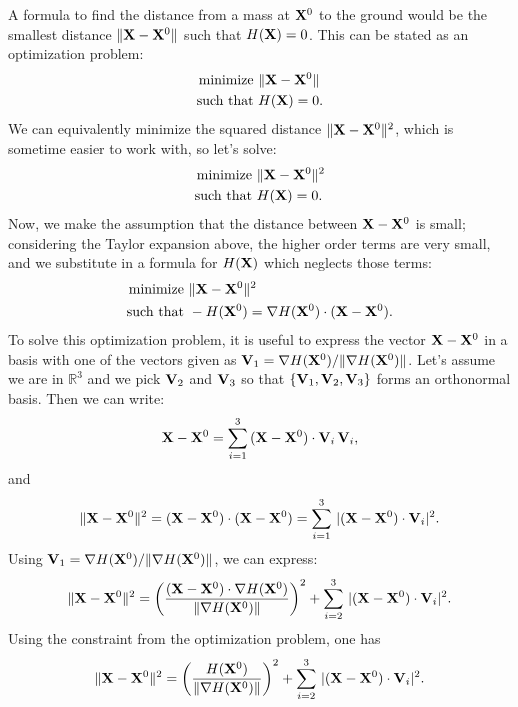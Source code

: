 \documentclass[10pt]{article}
\begin{document}
A formula to find the distance from a mass at ${\bf X}^0$ to the ground would be the smallest distance $\|{\bf X} - {\bf X}^0\|$ such that $H({\bf X}) = 0$.  This can be stated as an optimization problem:
\begin{align*}
\text{minimize } &\|{\bf X} - {\bf X}^0\| \\
\text{such that } &H({\bf X}) = 0.
\end{align*}
We can equivalently minimize the squared distance $\|{\bf X} - {\bf X}^0\|^2$, which is sometime easier to work with, so let's solve:
\begin{align*}
\text{minimize } &\|{\bf X} - {\bf X}^0\|^2 \\
\text{such that } &H({\bf X}) = 0.
\end{align*}
Now, we make the assumption that the distance between ${\bf X} - {\bf X}^0$ is small; considering the Taylor expansion above, the higher order terms are very small, and we substitute in a formula for $H({\bf X})$ which neglects those terms: 
\begin{align*}
\text{minimize } &\|{\bf X} - {\bf X}^0\|^2 \\
\text{such that } &-H({\bf X}^0) = \nabla H({\bf X}^0) \cdot ({\bf X} - {\bf X}^0).
\end{align*}
To solve this optimization problem, it is useful to express the vector ${\bf X} - {\bf X}^0$ in a basis with one of the vectors given as ${\bf V}_1 = \nabla H({\bf X}^0) / \|  \nabla H({\bf X}^0) \|$.  Let's assume we are in $\mathbb{R}^3$ and we pick ${\bf V}_2$ and ${\bf V}_3$ so that $\{ {\bf V}_1,  {\bf V}_2,  {\bf V}_3 \}$ forms an orthonormal basis.  Then we can write:
\begin{align*}
{\bf X} - {\bf X}^0 = \sum_{i=1}^3 \, ({\bf X} - {\bf X}^0) \cdot {\bf V}_i \, {\bf V}_i, 
\end{align*} 
and
\textbf{\begin{align*}
\|{\bf X} - {\bf X}^0\|^2 = ({\bf X} - {\bf X}^0) \cdot ({\bf X} - {\bf X}^0) = \sum_{i=1}^3 \, |({\bf X} - {\bf X}^0) \cdot {\bf V}_i|^2. 
\end{align*} }
Using ${\bf V}_1 = \nabla H({\bf X}^0) / \|  \nabla H({\bf X}^0) \|$, we can express:
\begin{align*}
\|{\bf X} - {\bf X}^0\|^2 = \left(\frac{({\bf X} - {\bf X}^0) \cdot \nabla H({\bf X}^0)}{\|  \nabla H({\bf X}^0) \|} \right)^2 +  \sum_{i=2}^3 \, |({\bf X} - {\bf X}^0) \cdot {\bf V}_i|^2. 
\end{align*} 
Using the constraint from the optimization problem, one has
\begin{align*}
\|{\bf X} - {\bf X}^0\|^2 = \left(\frac{H({\bf X}^0)}{\|  \nabla H({\bf X}^0) \|}\right)^2 +  \sum_{i=2}^3 \, |({\bf X} - {\bf X}^0) \cdot {\bf V}_i|^2. 
\end{align*} 
\end{document}
